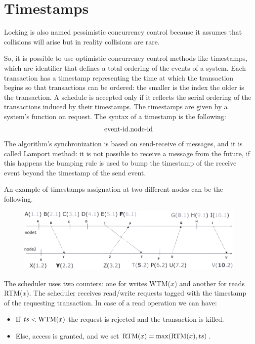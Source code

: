 \section{Timestamps}

Locking is also named pessimistic concurrency control because it assumes that collisions will arise but in reality collisions are rare. 

So, it is possible to use optimistic concurrency control methods like timestamps, which are identifier that defines a total ordering of the events of a system. Each transaction has a timestamp representing the time 
at which the transaction begins so that transactions can be ordered: the smaller is the index the older is the transaction. A schedule is accepted only if it reflects the serial 
ordering of the transactions induced by their timestamps. The timestamps are given by a system's function on request. The syntax of a timestamp is the following: 
\[\textnormal{event-id}.\textnormal{node-id}\]
The algorithm's synchronization is based on send-receive of messages, and it is called Lamport method: it is not possible to receive a message 
from the future, if this happens the bumping rule is used to bump the timestamp of the receive event beyond the timestamp of the send event.     
\begin{example}
    An example of timestamps assignation at two different nodes can be the following. 
    \begin{figure}[H]
        \centering
        \includegraphics[width=0.75\linewidth]{images/timestamps.png}
    \end{figure}
\end{example}
The scheduler uses two counters: one for writes WTM($x$) and another for reads RTM($x$). The scheduler receives read/write requests tagged with the timestamp of the 
requesting transaction. In case of a read operation we can have: 
\begin{itemize}
    \item If $ts<\textnormal{WTM}(x)$ the request is rejected and the transaction is killed. 
    \item Else, access is granted, and we set $\textnormal{RTM}(x)=\max(\textnormal{RTM}(x),ts)$. 
\end{itemize}
